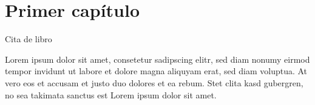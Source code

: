
\chapter{Primer capítulo}\label{ch:primer-capitulo}

Cita de libro \cite{Euler1982, Euler1984, Euler1985}


Lorem ipsum dolor sit amet, consetetur sadipscing elitr, sed diam nonumy eirmod
tempor invidunt ut labore et dolore magna aliquyam erat, sed diam voluptua. At
vero eos et accusam et justo duo dolores et ea rebum. Stet clita kasd gubergren,
no sea takimata sanctus est Lorem ipsum dolor sit amet.

\endinput
